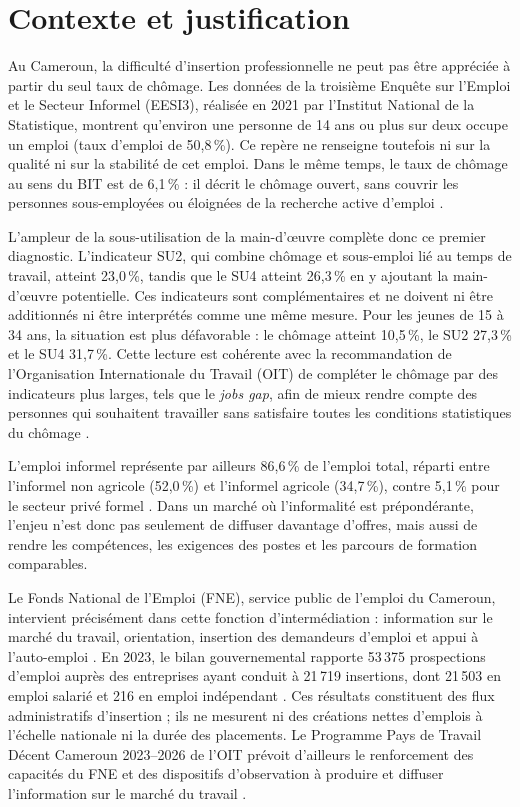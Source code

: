 \documentclass[12pt,twoside]{report}
\begin{document}
\section*{Contexte et justification}
Au Cameroun, la difficulté d'insertion professionnelle ne peut pas être appréciée à partir du seul taux de chômage. Les données de la troisième Enquête sur l'Emploi et le Secteur Informel (EESI3), réalisée en 2021 par l'Institut National de la Statistique, montrent qu'environ une personne de 14 ans ou plus sur deux occupe un emploi (taux d'emploi de 50,8\,\%). Ce repère ne renseigne toutefois ni sur la qualité ni sur la stabilité de cet emploi. Dans le même temps, le taux de chômage au sens du BIT est de 6,1\,\% : il décrit le chômage ouvert, sans couvrir les personnes sous-employées ou éloignées de la recherche active d'emploi \cite{ins2023eesi3emploi}.

L'ampleur de la sous-utilisation de la main-d'œuvre complète donc ce premier diagnostic. L'indicateur SU2, qui combine chômage et sous-emploi lié au temps de travail, atteint 23,0\,\%, tandis que le SU4 atteint 26,3\,\% en y ajoutant la main-d'œuvre potentielle. Ces indicateurs sont complémentaires et ne doivent ni être additionnés ni être interprétés comme une même mesure. Pour les jeunes de 15 à 34 ans, la situation est plus défavorable : le chômage atteint 10,5\,\%, le SU2 27,3\,\% et le SU4 31,7\,\%. Cette lecture est cohérente avec la recommandation de l'Organisation Internationale du Travail (OIT) de compléter le chômage par des indicateurs plus larges, tels que le \emph{jobs gap}, afin de mieux rendre compte des personnes qui souhaitent travailler sans satisfaire toutes les conditions statistiques du chômage \cite{ilo2024jobsgap}.

L'emploi informel représente par ailleurs 86,6\,\% de l'emploi total, réparti entre l'informel non agricole (52,0\,\%) et l'informel agricole (34,7\,\%), contre 5,1\,\% pour le secteur privé formel \cite{ins2023eesi3emploi}. Dans un marché où l'informalité est prépondérante, l'enjeu n'est donc pas seulement de diffuser davantage d'offres, mais aussi de rendre les compétences, les exigences des postes et les parcours de formation comparables.

Le Fonds National de l'Emploi (FNE), service public de l'emploi du Cameroun, intervient précisément dans cette fonction d'intermédiation : information sur le marché du travail, orientation, insertion des demandeurs d'emploi et appui à l'auto-emploi \cite{fnepresentation}. En 2023, le bilan gouvernemental rapporte 53\,375 prospections d'emploi auprès des entreprises ayant conduit à 21\,719 insertions, dont 21\,503 en emploi salarié et 216 en emploi indépendant \cite{rasipefin2024}. Ces résultats constituent des flux administratifs d'insertion ; ils ne mesurent ni des créations nettes d'emplois à l'échelle nationale ni la durée des placements. Le Programme Pays de Travail Décent Cameroun 2023--2026 de l'OIT prévoit d'ailleurs le renforcement des capacités du FNE et des dispositifs d'observation à produire et diffuser l'information sur le marché du travail \cite{ilo2023pptdcameroun}.
\end{document}
